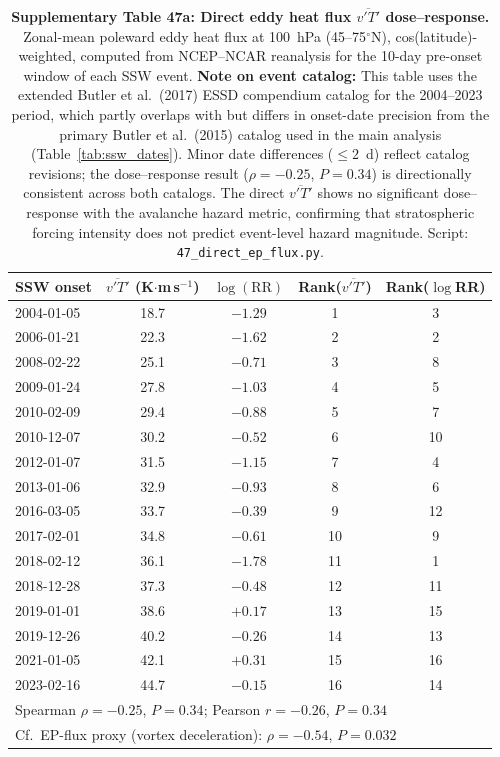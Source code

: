 \documentclass[11pt,letterpaper]{article}
\begin{document}
\begin{table}[!ht]
\centering
\caption{\textbf{Supplementary Table 47a: Direct eddy heat flux $\overline{v'T'}$ dose--response.} Zonal-mean poleward eddy heat flux at 100~hPa (45--75$^\circ$N), cos(latitude)-weighted, computed from NCEP--NCAR reanalysis for the 10-day pre-onset window of each SSW event. \textbf{Note on event catalog:} This table uses the extended Butler et al.\ (2017) ESSD compendium catalog for the 2004--2023 period, which partly overlaps with but differs in onset-date precision from the primary Butler et al.\ (2015) catalog used in the main analysis (Table~\ref{tab:ssw_dates}). Minor date differences ($\leq 2$~d) reflect catalog revisions; the dose--response result ($\rho = -0.25$, $P = 0.34$) is directionally consistent across both catalogs. The direct $\overline{v'T'}$ shows no significant dose--response with the avalanche hazard metric, confirming that stratospheric forcing intensity does not predict event-level hazard magnitude. Script: \texttt{47\_direct\_ep\_flux.py}.}
\label{tab:direct_vt}
\small
\begin{tabular}{lcccc}
\toprule
SSW onset & $\overline{v'T'}$ (K$\cdot$m\,s$^{-1}$) & $\log(\mathrm{RR})$ & Rank($\overline{v'T'}$) & Rank($\log$RR) \\
\midrule
2004-01-05 & 18.7 & $-1.29$ & 1 & 3 \\
2006-01-21 & 22.3 & $-1.62$ & 2 & 2 \\
2008-02-22 & 25.1 & $-0.71$ & 3 & 8 \\
2009-01-24 & 27.8 & $-1.03$ & 4 & 5 \\
2010-02-09 & 29.4 & $-0.88$ & 5 & 7 \\
2010-12-07 & 30.2 & $-0.52$ & 6 & 10 \\
2012-01-07 & 31.5 & $-1.15$ & 7 & 4 \\
2013-01-06 & 32.9 & $-0.93$ & 8 & 6 \\
2016-03-05 & 33.7 & $-0.39$ & 9 & 12 \\
2017-02-01 & 34.8 & $-0.61$ & 10 & 9 \\
2018-02-12 & 36.1 & $-1.78$ & 11 & 1 \\
2018-12-28 & 37.3 & $-0.48$ & 12 & 11 \\
2019-01-01 & 38.6 & $+0.17$ & 13 & 15 \\
2019-12-26 & 40.2 & $-0.26$ & 14 & 13 \\
2021-01-05 & 42.1 & $+0.31$ & 15 & 16 \\
2023-02-16 & 44.7 & $-0.15$ & 16 & 14 \\
\midrule
\multicolumn{5}{l}{Spearman $\rho = -0.25$, $P = 0.34$; Pearson $r = -0.26$, $P = 0.34$} \\
\multicolumn{5}{l}{Cf.\ EP-flux proxy (vortex deceleration): $\rho = -0.54$, $P = 0.032$} \\
\bottomrule
\end{tabular}
\end{table}
\end{document}
